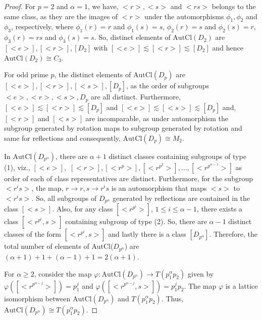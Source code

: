 \documentclass{article}
\theoremstyle{definition}
\begin{document}
\begin{proof}
     For $p=2$ and $\alpha=1$, we have, $\bigl<r\bigr>,\bigl<s\bigr>$ and $\bigl<rs\bigr>$ belongs to the same class, as they are the images of $\bigl<r\bigr>$ under the automorphisms $\phi_1,\phi_2$ and $\phi_3$, respectively, where $\phi_1(r)=r$ and $\phi_1(s)=s$, $\phi_2(r)=s$ and $\phi_2(s)=r$, $\phi_3(r)=rs$ and $\phi_3(s)=s$. So, distinct elements of $\text{AutCl}(D_2)$ are $[\bigl<e\bigr>],[\bigl<r\bigr>],[D_2]$ with $[\bigl<e\bigr>]\lesssim[\bigl<r\bigr>]\lesssim[D_2]$ and hence $\text{AutCl}(D_2)\cong C_3$.\par
For odd prime $p$, the distinct elements of $\text{AutCl}(D_p)$ are $[\bigl<e\bigr>],[\bigl<r\bigr>],[\bigl<s\bigr>],[D_p]$, as the order of subgroups $\bigl<e\bigr>,\bigl<r\bigr>,\bigl<s\bigr>,D_p$ are all distinct. Furthermore, $[\bigl<e\bigr>]\lesssim [\bigl<r\bigr>]\lesssim [D_p]$ and $[\bigl<e\bigr>]\lesssim [\bigl<s\bigr>]\lesssim[D_p]$ and, $[\bigl<r\bigr>]$ and $[\bigl<s\bigr>]$ are incomparable, as under automorphism the subgroup generated by rotation maps to subgroup generated by rotation and same for reflections and consequently, $\text{AutCl}(D_p)\cong M_2$. \par
In $\text{AutCl}(D_{p^\alpha})$, there are $\alpha+1$ distinct classes containing subgroups of type (1), viz., $[\bigl<e\bigr>],$  $ [\bigl<r\bigr>],[\bigl<r^p\bigr>],[\bigl<r^{p^2}\bigr>],\dots,[\bigl<r^{p^{\alpha-1}}\bigr>]$ as order of each of class representatives are distinct. Furthermore, for the subgroup $\bigl<r^is\bigr>$, the map, $r\to r, s\to r^is$ is an automorphism that maps $\bigl<s\bigr>$ to $\bigl<r^is\bigr>$. So, all subgroups of $D_{p^\alpha}$ generated by reflections are contained in the class $[\bigl<s\bigr>]$. Also, for any class $[\bigl<r^{p^i}\bigr>]$, $1\le i\le \alpha-1$, there exists a class $[\bigl<r^{p^i},s\bigr>   ]$ containing subgroup of type (2). So, there are $\alpha-1$ distinct classes of the form $[\bigl<r^{p^i},s\bigr>]$ and lastly there is a class $[D_{p^\alpha}]$. Therefore, the total number of elements of AutCl($D_{p^\alpha}$) are $(\alpha+1)+1+(\alpha-1)+1=2(\alpha+1)$. \par For $\alpha\ge 2$, consider the map $\varphi: \text{AutCl}(D_{p^{\alpha}})\to T(p_1^\alpha p_2)$ given by $\varphi([\bigl<r^{p^{\alpha-j}}\bigr>])=p_1^j$ and $\varphi([\bigl<r^{p^{\alpha-j}},s\bigr>])=p_1^jp_2$. The map $\varphi$ is a lattice isomorphism between $\text{AutCl}(D_{p^{\alpha}})$ and $T(p_1^\alpha p_2)$. Thus, $\text{AutCl}(D_{p^{\alpha}})\cong T(p_1^\alpha p_2)$. \par

\end{proof}
\end{document}
